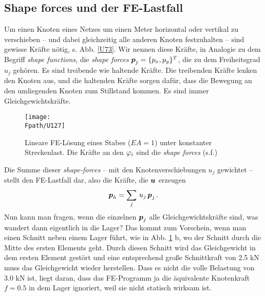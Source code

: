{\textcolor{sectionTitleBlue}{\section{Shape forces und der FE-Lastfall}}}
Um einen Knoten eines Netzes um einen Meter horizontal oder vertikal zu verschieben -- und dabei gleichzeitig alle anderen Knoten festzuhalten -- sind gewisse Kr\"{a}fte n\"{o}tig, s. Abb. \ref{U73}. Wir nennen diese Kr\"{a}fte, in Analogie zu dem Begriff {\em shape functions\/}, die {\em shape forces\/} $\mbox{\boldmath $p$}_j = \{p_x, p_y\}^T$, die zu dem Freiheitsgrad $u_j$ geh\"{o}ren. Es sind treibende wie haltende Kr\"{a}fte. Die treibenden Kr\"{a}fte lenken den Knoten aus, und die haltenden Kr\"{a}fte sorgen daf\"{u}r, dass die Bewegung an den umliegenden Knoten zum Stillstand kommen. Es sind immer Gleichgewichtskr\"{a}fte.
\begin{figure}[tbp]
\centering
\if {} \sidecaption \fi
\texttt{[image: \\Fpath/U127]}
\caption{Lineare FE-L\"{o}sung eines Stabes ($EA = 1$) unter konstanter Streckenlast. Die Kr\"{a}fte an den $\varphi_i$ sind die {\em shape forces\/} (s.f.)} \label{U127}
\end{figure}%

Die Summe dieser {\em shape-forces\/} -- mit den Knotenverschiebungen $u_j$ gewich\-tet -- stellt den FE-Lastfall dar, also die Kr\"{a}fte, die $\mbox{\boldmath $u$}$ erzeugen
\begin{align}\label{Eq70}
\mbox{\boldmath $p$}_h = \sum_j\,u_j\,\mbox{\boldmath $p$}_j\,.
\end{align}
Nun kann man fragen, wenn die einzelnen $\mbox{\boldmath $p$}_j$ alle Gleichgewichtskr\"{a}fte sind, was wandert dann eigentlich in die Lager? Das kommt zum Vorschein, wenn man einen Schnitt neben einem Lager f\"{u}hrt, wie in Abb. \ref{U127} b, wo der Schnitt durch die Mitte des ersten Elements geht. Durch diesen Schnitt wird das Gleichgewicht in dem ersten Element gest\"{o}rt und eine entsprechend gro{\ss}e Schnittkraft von 2.5 kN muss das Gleichgewicht wieder herstellen. Dass es nicht die volle Belastung von 3.0 kN ist, liegt daran, dass das FE-Programm ja die \"{a}quivalente Knotenkraft $f = 0.5$ in dem Lager ignoriert, weil sie nicht statisch wirksam ist.

